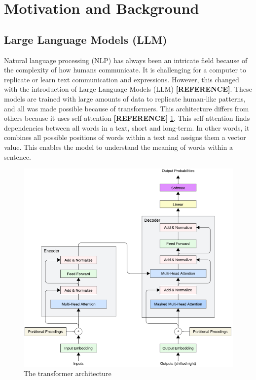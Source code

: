 

\section{Motivation and Background}

\subsection{Large Language Models (LLM)}
Natural language processing (NLP) has always been an intricate field because of the complexity of how humans communicate.
It is challenging for a computer to replicate or learn text communication and expressions. However, this changed with the introduction
of Large Language Models (LLM) \textbf{[REFERENCE]}. These models are trained with large amounts of data to replicate human-like patterns,
and all was made possible because of transformers. This architecture differs from others because it uses self-attention \textbf{[REFERENCE]} \ref{transformer}.
This self-attention finds dependencies between all words in a text, short and long-term. In other words, it combines all possible 
positions of words within a text and assigns them a vector value. This enables the model to understand the meaning of words within a sentence. 

\begin{figure}[!htb]
    \centering
        \includegraphics[width=0.75\linewidth]{figures/transformers_architecture.png}
        \caption{The transformer architecture}
        \label{transformer}
\end{figure}



